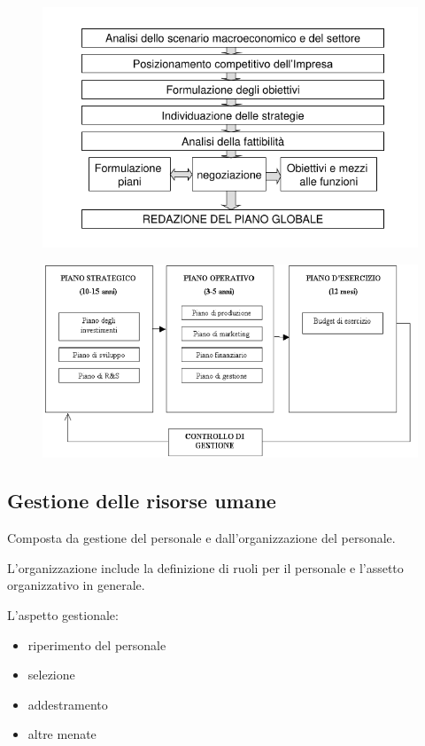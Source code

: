 \begin{figure}[H]
    \centering
    \includegraphics[width=0.5\linewidth]{1/img/Screenshot from 2022-07-04 17-21-38.png}
\end{figure}

\begin{figure}[H]
    \centering
    \includegraphics[width=0.5\linewidth]{1/img/Screenshot from 2022-07-04 17-22-15.png}
\end{figure}


\subsection{Gestione delle risorse umane}
Composta da gestione del personale e dall'organizzazione del personale.

L'organizzazione include la definizione di ruoli per il personale e l'assetto organizzativo in generale.


L'aspetto gestionale:
\begin{itemize}
    \item riperimento del personale
    \item selezione
    \item addestramento
    \item altre menate
\end{itemize}

